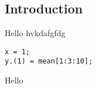 \documentclass[../main.tex]{subfiles}
\begin{document}
\subsection{Introduction}

Hello hvkdafgfdg


\begin{lstlisting}[caption={My lstlisting}, label={lst:2}]
x = 1;
y.(1) = mean[1:3:10];
\end{lstlisting}

Hello
\end{document}
